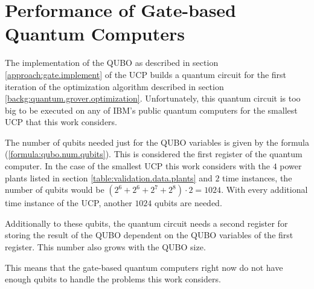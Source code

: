\section{Performance of Gate-based Quantum Computers}

The implementation of the QUBO as described in section \ref{approach:gate.implement} of the UCP builds a quantum circuit for the first iteration of the optimization algorithm described in section \ref{backg:quantum.grover.optimization}.
Unfortunately, this quantum circuit is too big to be executed on any of IBM's public quantum computers for the smallest UCP that this work considers.

The number of qubits needed just for the QUBO variables is given by the formula (\ref{formula:qubo.num.qubits}).
This is considered the first register of the quantum computer.
In the case of the smallest UCP this work considers with the $4$ power plants listed in section \ref{table:validation.data.plants} and $2$ time instances, the number of qubits would be $\left( 2^6 + 2^6 + 2^7 + 2^8 \right) \cdot 2 = 1024$.
With every additional time instance of the UCP, another $1024$ qubits are needed.

Additionally to these qubits, the quantum circuit needs a second register for storing the result of the QUBO dependent on the QUBO variables of the first register.
This number also grows with the QUBO size.

This means that the gate-based quantum computers right now do not have enough qubits to handle the problems this work considers.
